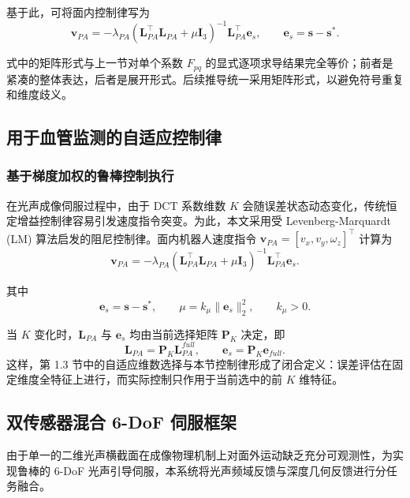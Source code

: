 \documentclass{article}
\begin{document}
基于此，可将面内控制律写为
\begin{equation}
\mathbf{v}_{PA} = -\lambda_{PA}(\mathbf{L}_{PA}^{\top}\mathbf{L}_{PA} + \mu \mathbf{I}_3)^{-1}\mathbf{L}_{PA}^{\top}\mathbf{e}_s,
\qquad
\mathbf{e}_s = \mathbf{s} - \mathbf{s}^{*}.
\end{equation}

式中的矩阵形式与上一节对单个系数 $F_{pq}$ 的显式逐项求导结果完全等价；前者是紧凑的整体表达，后者是展开形式。后续推导统一采用矩阵形式，以避免符号重复和维度歧义。
\subsection{用于血管监测的自适应控制律}
\label{sec:Adaptive_Control_Law}
\subsubsection{基于梯度加权的鲁棒控制执行}

在光声成像伺服过程中，由于 DCT 系数维数 $K$ 会随误差状态动态变化，传统恒定增益控制律容易引发速度指令突变。为此，本文采用受 Levenberg-Marquardt (LM) 算法启发的阻尼控制律。面内机器人速度指令 $\mathbf{v}_{PA} = [v_x, v_y, \omega_z]^\top$ 计算为 \cite{dame2009entropy,collewet2011photometric,marchand2019subspace}
\begin{equation}
\mathbf{v}_{PA} = -\lambda_{PA}(\mathbf{L}_{PA}^{\top}\mathbf{L}_{PA} + \mu \mathbf{I}_3)^{-1}\mathbf{L}_{PA}^{\top}\mathbf{e}_s.
\end{equation}

其中
\begin{equation}
\mathbf{e}_s = \mathbf{s} - \mathbf{s}^{*}, \qquad
\mu = k_{\mu}\|\mathbf{e}_s\|_2^2, \qquad k_{\mu} > 0 .
\end{equation}

当 $K$ 变化时，$\mathbf{L}_{PA}$ 与 $\mathbf{e}_s$ 均由当前选择矩阵 $\mathbf{P}_K$ 决定，即
\begin{equation}
\mathbf{L}_{PA} = \mathbf{P}_K \mathbf{L}_{PA}^{full}, \qquad
\mathbf{e}_s = \mathbf{P}_K \mathbf{e}_{full} .
\end{equation}
这样，第 1.3 节中的自适应维数选择与本节控制律形成了闭合定义：误差评估在固定维度全特征上进行，而实际控制只作用于当前选中的前 $K$ 维特征。

\subsection{双传感器混合 6-DoF 伺服框架}
由于单一的二维光声横截面在成像物理机制上对面外运动缺乏充分可观测性，为实现鲁棒的 6-DoF 光声引导伺服，本系统将光声频域反馈与深度几何反馈进行分任务融合。
\end{document}
